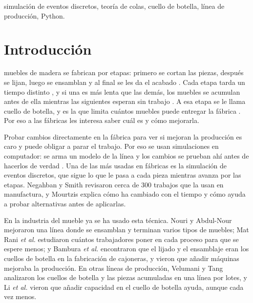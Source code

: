 \documentclass[conference,a4paper]{IEEEtran}
\begin{document}
\begin{IEEEkeywords}
simulación de eventos discretos, teoría de colas, cuello de botella, línea de producción,
Python.
\end{IEEEkeywords}

\section{Introducción}
 muebles de madera se fabrican por etapas: primero se cortan las
piezas, después se lijan, luego se ensamblan y al final se les da el acabado
\cite{nouri2019,matrani2026,bambura2020}. Cada etapa tarda un tiempo distinto
\cite{nouri2019,bambura2020}, y si una es más lenta que las demás, los muebles se acumulan
antes de ella mientras las siguientes esperan sin trabajo \cite{matrani2026,velumani2017}. A
esa etapa se le llama cuello de botella, y es la que limita cuántos muebles puede entregar
la fábrica \cite{bambura2020,li2020}. Por eso a las fábricas les interesa saber cuál es y
cómo mejorarla.

Probar cambios directamente en la fábrica para ver si mejoran la producción es caro y puede
obligar a parar el trabajo. Por eso se usan simulaciones en computador: se arma un modelo de
la línea y los cambios se prueban ahí antes de hacerlos de verdad
\cite{negahban2014,mourtzis2020}. Una de las más usadas en fábricas es la simulación de
eventos discretos, que sigue lo que le pasa a cada pieza mientras avanza por las etapas.
Negahban y Smith \cite{negahban2014} revisaron cerca de 300 trabajos que la usan en
manufactura, y Mourtzis \cite{mourtzis2020} explica cómo ha cambiado con el tiempo y cómo
ayuda a probar alternativas antes de aplicarlas.

En la industria del mueble ya se ha usado esta técnica. Nouri y Abdul-Nour \cite{nouri2019}
mejoraron una línea donde se ensamblan y terminan varios tipos de muebles; Mat Rani
\textit{et al.} \cite{matrani2026} estudiaron cuántos trabajadores poner en cada proceso
para que se espere menos; y Bambura \textit{et al.} \cite{bambura2020} encontraron que el
lijado y el ensamblaje eran los cuellos de botella en la fabricación de cajoneras, y vieron
que añadir máquinas mejoraba la producción. En otras líneas de producción, Velumani y Tang
\cite{velumani2017} analizaron los cuellos de botella y las piezas acumuladas en una línea
por lotes, y Li \textit{et al.} \cite{li2020} vieron que añadir capacidad en el cuello de
botella ayuda, aunque cada vez menos.
\end{document}
